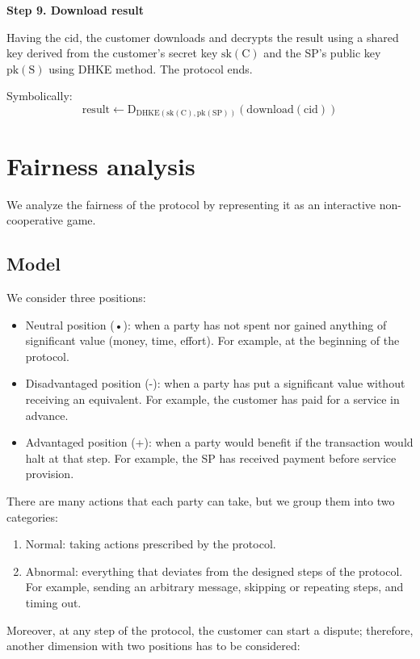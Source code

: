 \noindent \textbf
{Step 9. Download result}\label{step-9-download-result}

Having the $\mathrm{cid}$, the customer downloads and decrypts the $\mathrm{result}$ using a shared key derived from the customer's secret key $\mathrm{sk(C)}$ and the SP's public key $\mathrm{pk(S)}$ using DHKE method. The protocol ends.

Symbolically: 
\[
\mathrm{result \gets D_{DHKE(sk(C), pk(SP))}(download(cid))}
\]

\section{Fairness analysis}\label{sec:fairness-analysis}
We analyze the fairness of the protocol by representing it as an interactive non-cooperative game.

\subsection{Model}\label{sec:fairness-model}
We consider three positions:

\begin{itemize}
\item Neutral position (•): when a party has not spent nor gained anything of significant value (money, time, effort). For example, at the beginning of the protocol.
\item Disadvantaged position (-): when a party has put a significant value without receiving an equivalent. For example, the customer has paid for a service in advance.
\item Advantaged position (+): when a party would benefit if the transaction would halt at that step. For example, the SP has received payment before service provision.
\end{itemize}

There are many actions that each party can take, but we group them into two categories:

\begin{enumerate}
\def\labelenumi{\arabic{enumi}.}

\item Normal: taking actions prescribed by the protocol.
\item Abnormal: everything that deviates from the designed steps of the protocol. For example, sending an arbitrary message, skipping or repeating steps, and timing out.
\end{enumerate}

Moreover, at any step of the protocol, the customer can start a dispute; therefore, another dimension with two positions has to be considered:

